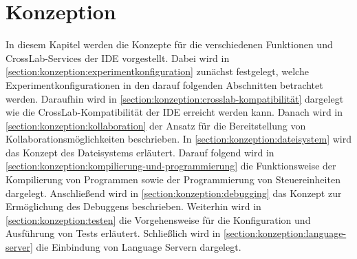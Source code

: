 \chapter{Konzeption}\label{section:konzeption}

In diesem Kapitel werden die Konzepte für die verschiedenen Funktionen und CrossLab-Services der IDE vorgestellt. Dabei wird in \autoref{section:konzeption:experimentkonfiguration} zunächst festgelegt, welche Experimentkonfigurationen in den darauf folgenden Abschnitten betrachtet werden. Daraufhin wird in \autoref{section:konzeption:crosslab-kompatibilität} dargelegt wie die CrossLab-Kompatibilität der IDE erreicht werden kann. Danach wird in \autoref{section:konzeption:kollaboration} der Ansatz für die Bereitstellung von Kollaborationsmöglichkeiten beschrieben. In \autoref{section:konzeption:dateisystem} wird das Konzept des Dateisystems erläutert. Darauf folgend wird in \autoref{section:konzeption:kompilierung-und-programmierung} die Funktionsweise der Kompilierung von Programmen sowie der Programmierung von Steuereinheiten dargelegt. Anschließend wird in \autoref{section:konzeption:debugging} das Konzept zur Ermöglichung des Debuggens beschrieben. Weiterhin wird in \autoref{section:konzeption:testen} die Vorgehensweise für die Konfiguration und Ausführung von Tests erläutert. Schließlich wird in \autoref{section:konzeption:language-server} die Einbindung von Language Servern dargelegt.








